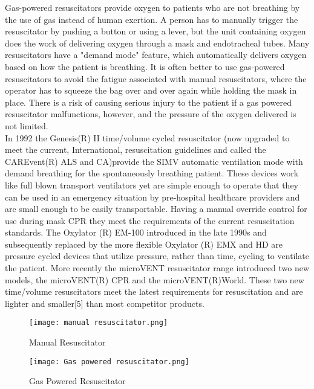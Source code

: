 \documentclass[12pt]{article}
\begin{document}
Gas-powered resuscitators provide oxygen to patients who are not breathing by the use of gas instead of human exertion. A person has to manually trigger the resuscitator by pushing a button or using a lever, but the unit containing oxygen does the work of delivering oxygen through a mask and endotracheal tubes. Many resuscitators have a "demand mode" feature, which automatically delivers oxygen based on how the patient is breathing. It is often better to use gas-powered resuscitators to avoid the fatigue associated with manual resuscitators, where the operator has to squeeze the bag over and over again while holding the mask in place. There is a risk of causing serious injury to the patient if a gas powered resuscitator malfunctions, however, and the pressure of the oxygen delivered is not limited.\newline\\
 In 1992 the Genesis(R) II time/volume cycled resuscitator (now upgraded to meet the current, International, resuscitation guidelines and called the CAREvent(R) ALS and CA)provide the SIMV automatic ventilation mode with demand breathing for the spontaneously breathing patient. These devices work like full blown transport ventilators yet are simple enough to operate that they can be used in an emergency situation by pre-hospital healthcare providers and are small enough to be easily transportable. Having a manual override control for use during mask CPR they meet the requirements of the current resuscitation standards. The Oxylator (R) EM-100 introduced in the late 1990s and subsequently replaced by the more flexible Oxylator (R) EMX and HD are pressure cycled devices that utilize pressure, rather than time, cycling to ventilate the patient. More recently the microVENT resuscitator range introduced two new models, the microVENT(R) CPR and the microVENT(R)World. These two new time/volume resuscitators meet the latest requirements for resuscitation and are lighter and smaller[5] than most competitor products.
\begin{figure}
    \centering
    \texttt{[image: manual resuscitator.png]}
    \caption{Manual Resuscitator}
    \texttt{[image: Gas powered resuscitator.png]}
    \caption{Gas Powered Resuscitator}
\end{figure}
\newpage
\end{document}
